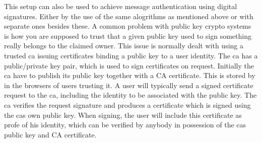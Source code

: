 This setup can also be used to achieve message authentication using digital signatures. Either by the use of the same alogrithms as mentioned above or with separate ones besides these. A common problem with public key crypto systems is how you are supposed to trust that a given public key used to sign something really belongs to the claimed owner. This issue is normally dealt with using a trusted \gls{ca} issuing certificates binding a public key to a user identity. The \gls{ca} has a public/private key pair, which is used to sign certificates on request. Initially the \gls{ca} have to publish its public key together with a CA certificate. This is stored by in the browsers of users trusting it. A user will typically send a signed certificate request to the \gls{ca}, including the identity to be associated with the public key. The \gls{ca} verifies the request signature and produces a certificate which is signed using the \glspl{ca} own public key. When signing, the user will include this certificate as profe of his identity, which can be verified by anybody in possession of the \glspl{ca} public key and CA certificate. 


